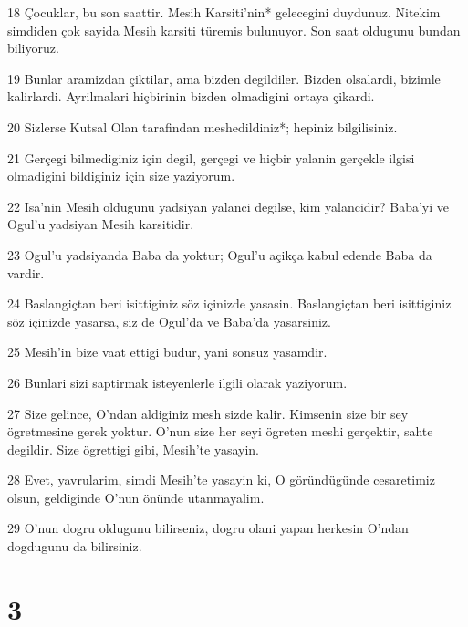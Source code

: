 \par 18 Çocuklar, bu son saattir. Mesih Karsiti'nin* gelecegini duydunuz. Nitekim simdiden çok sayida Mesih karsiti türemis bulunuyor. Son saat oldugunu bundan biliyoruz.
\par 19 Bunlar aramizdan çiktilar, ama bizden degildiler. Bizden olsalardi, bizimle kalirlardi. Ayrilmalari hiçbirinin bizden olmadigini ortaya çikardi.
\par 20 Sizlerse Kutsal Olan tarafindan meshedildiniz*; hepiniz bilgilisiniz.
\par 21 Gerçegi bilmediginiz için degil, gerçegi ve hiçbir yalanin gerçekle ilgisi olmadigini bildiginiz için size yaziyorum.
\par 22 Isa'nin Mesih oldugunu yadsiyan yalanci degilse, kim yalancidir? Baba'yi ve Ogul'u yadsiyan Mesih karsitidir.
\par 23 Ogul'u yadsiyanda Baba da yoktur; Ogul'u açikça kabul edende Baba da vardir.
\par 24 Baslangiçtan beri isittiginiz söz içinizde yasasin. Baslangiçtan beri isittiginiz söz içinizde yasarsa, siz de Ogul'da ve Baba'da yasarsiniz.
\par 25 Mesih'in bize vaat ettigi budur, yani sonsuz yasamdir.
\par 26 Bunlari sizi saptirmak isteyenlerle ilgili olarak yaziyorum.
\par 27 Size gelince, O'ndan aldiginiz mesh sizde kalir. Kimsenin size bir sey ögretmesine gerek yoktur. O'nun size her seyi ögreten meshi gerçektir, sahte degildir. Size ögrettigi gibi, Mesih'te yasayin.
\par 28 Evet, yavrularim, simdi Mesih'te yasayin ki, O göründügünde cesaretimiz olsun, geldiginde O'nun önünde utanmayalim.
\par 29 O'nun dogru oldugunu bilirseniz, dogru olani yapan herkesin O'ndan dogdugunu da bilirsiniz.

\chapter{3}

